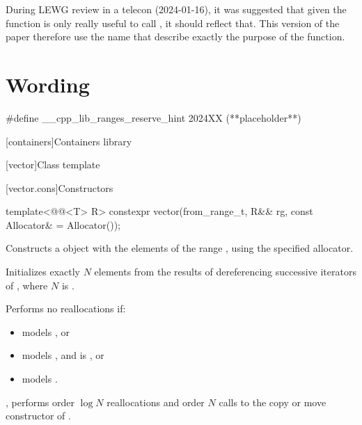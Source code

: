 \documentclass{wg21}
\begin{document}
During LEWG review in a telecon (2024-01-16), it was suggested that given the function is only really useful to call , it should reflect that.
This version of the paper therefore use the name  that describe exactly the purpose of the function.


\section{Wording}

\begin{addedblock}
\begin{codeblock}
    #define __cpp_lib_ranges_reserve_hint 2024XX (**placeholder**)
\end{codeblock}
\end{addedblock}

[containers]{Containers library}

[vector]{Class template }

[vector.cons]{Constructors}

%
\begin{itemdecl}
    template<@@<T> R>
    constexpr vector(from_range_t, R&& rg, const Allocator& = Allocator());
\end{itemdecl}

\begin{itemdescr}
    \pnum
    \effects
    Constructs a  object with the elements of the range ,
    using the specified allocator.

    \pnum
    \complexity
    Initializes exactly $N$ elements
    from the results of dereferencing successive iterators of ,
    where $N$ is .

\begin{addedblock}
    Performs no reallocations if:
    \begin{itemize}
    \item {} models , or
    \item {} models , %
    and  is , or
    \item {} models .
    \end{itemize}
\end{addedblock}
     , performs order $\log N$ reallocations and
    order $N$ calls to the copy or move constructor of .
\end{itemdescr}
\end{document}
